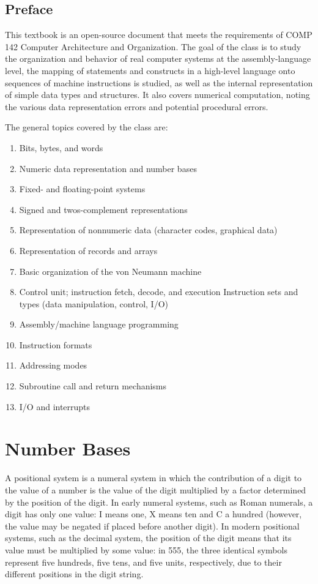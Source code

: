 \documentclass[letterpaper, 10pt]{book}
\begin{document}

\section{Preface\label{sec:preface}}

This textbook is an open-source document that meets the requirements of COMP 142 Computer Architecture and Organization. The goal of the class is to study the organization and behavior of real computer systems at the assembly-language level, the mapping of statements and constructs in a high-level language onto sequences of machine instructions is studied, as well as the internal representation of simple data types and structures. It also covers numerical computation, noting the various data representation errors and potential procedural errors.

The general topics covered by the class are:

\begin{enumerate}
\item Bits, bytes, and words
\item Numeric data representation and number bases
\item Fixed- and floating-point systems
\item Signed and twos-complement representations
\item Representation of nonnumeric data (character codes, graphical data)
\item Representation of records and arrays
\item Basic organization of the von Neumann machine
\item Control unit; instruction fetch, decode, and execution
    Instruction sets and types (data manipulation, control, I/O)
\item Assembly/machine language programming
\item Instruction formats
\item Addressing modes
\item Subroutine call and return mechanisms
\item I/O and interrupts
\end{enumerate}

\chapter{Number Bases\label{sec:numbers}}
\setcounter{examples}{1}

A positional system is a numeral system in which the contribution of a digit to the value of a number 
is the value of the digit multiplied by a factor determined by the position of the digit. In early 
numeral systems, such as Roman numerals, a digit has only one value: I means one, X means ten and C 
a hundred (however, the value may be negated if placed before another digit). In modern positional 
systems, such as the decimal system, the position of the digit means that its value must be multiplied 
by some value: in 555, the three identical symbols represent five hundreds, five tens, and five units, 
respectively, due to their different positions in the digit string. 
\end{document}
